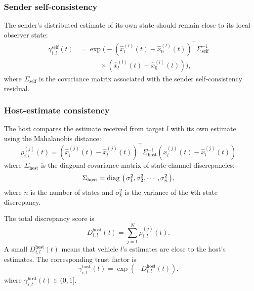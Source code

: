 \documentclass[journal,twoside]{IEEEtran}
\def\diag#1{\mathop{{\rm diag}\,\left(\,#1\,\right)}}
\begin{document}
\subsubsection{Sender self-consistency}
The sender's distributed estimate of its own state should remain close to its local observer state:
\begin{equation}
    \begin{aligned}
    \gamma_{i,l}^{\text{self}}(t)
    &=
    \exp\Big(
    -(\hat{x}_l^{(l)}(t)-\hat{x}_0^{(l)}(t))^{\top}
    \Sigma_{\text{self}}^{-1} \\
    &\qquad\quad \times
    (\hat{x}_l^{(l)}(t)-\hat{x}_0^{(l)}(t))
    \Big),
    \end{aligned}
\end{equation}
where $\Sigma_{\text{self}}$ is the covariance matrix associated with the sender self-consistency residual.

\subsubsection{Host-estimate consistency}
The host compares the estimate received from target $l$ with its own estimate using the Mahalanobis distance:
\begin{equation}
    \rho_{i,l}^{(j)}(t) = \left( \hat{x}_i^{(j)}(t) - \hat{x}_l^{(j)}(t) \right)^{\top} \Sigma_{\text{host}}^{-1} \left( \hat{x}_i^{(j)}(t) - \hat{x}_l^{(j)}(t) \right)
    \label{eq_dis_glo}
\end{equation}
where $\Sigma_{\text{host}}$ is the diagonal covariance matrix of state-channel discrepancies:
\begin{equation}
\Sigma_{\text{host}} = \diag{\sigma^2_1, \sigma^2_2, \cdots , \sigma^2_n},
\end{equation}
where $n$ is the number of states and $\sigma^2_k$ is the variance of the $k$th state discrepancy.

The total discrepancy score is
\begin{equation}
    D_{i,l}^{\text{host}}(t) = \sum_{j=1}^N \rho_{i,l}^{(j)}(t).
\end{equation}
A small $D_{i,l}^{\text{host}}(t)$ means that vehicle $l$'s estimates are close to the host's estimates. The corresponding trust factor is
\begin{equation}
    \gamma_{i,l}^{\text{host}}(t) = \exp\left( -D_{i,l}^{\text{host}}(t) \right).
\end{equation}
where $\gamma_{i,l}^{\text{host}}(t) \in (0, 1]$.
\end{document}
